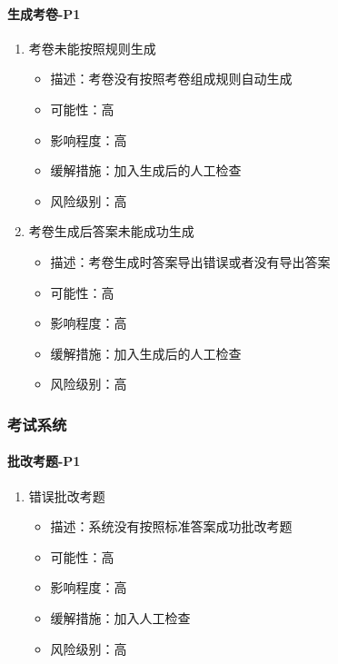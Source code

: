 \documentclass[hyperref, a4paper]{ctexart}
\providecommand{\tightlist}{%
  \setlength{\itemsep}{0pt}\setlength{\parskip}{0pt}}
\let\oldparagraph\paragraph
\renewcommand{\paragraph}[1]{\oldparagraph{#1}\mbox{}}
\begin{document}
\hypertarget{ux751fux6210ux8003ux5377-p1}{%
\paragraph{生成考卷-P1}\label{ux751fux6210ux8003ux5377-p1}}

\begin{enumerate}
\def\labelenumi{\arabic{enumi}.}
\tightlist
\item
  考卷未能按照规则生成

  \begin{itemize}
  \tightlist
  \item
    描述：考卷没有按照考卷组成规则自动生成
  \item
    可能性：高
  \item
    影响程度：高
  \item
    缓解措施：加入生成后的人工检查
  \item
    风险级别：高
  \end{itemize}
\item
  考卷生成后答案未能成功生成

  \begin{itemize}
  \tightlist
  \item
    描述：考卷生成时答案导出错误或者没有导出答案
  \item
    可能性：高
  \item
    影响程度：高
  \item
    缓解措施：加入生成后的人工检查
  \item
    风险级别：高
  \end{itemize}
\end{enumerate}

\hypertarget{ux8003ux8bd5ux7cfbux7edf-1}{%
\subsubsection{考试系统}\label{ux8003ux8bd5ux7cfbux7edf-1}}

\hypertarget{ux6279ux6539ux8003ux9898-p1}{%
\paragraph{批改考题-P1}\label{ux6279ux6539ux8003ux9898-p1}}

\begin{enumerate}
\def\labelenumi{\arabic{enumi}.}
\tightlist
\item
  错误批改考题

  \begin{itemize}
  \tightlist
  \item
    描述：系统没有按照标准答案成功批改考题
  \item
    可能性：高
  \item
    影响程度：高
  \item
    缓解措施：加入人工检查
  \item
    风险级别：高
  \end{itemize}
\end{enumerate}
\end{document}
